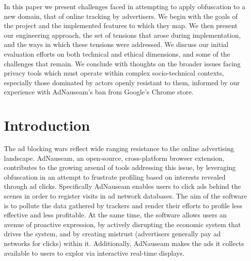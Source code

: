 \documentclass[conference]{IEEEtran}
\begin{document}
\indent In this paper we present challenges faced in attempting to apply obfuscation to a new domain, that of online tracking by advertisers. We begin with the goals of the project and the implemented features to which they map. We then present our engineering approach, the set of tensions that arose during implementation, and the ways in which these tensions were addressed. We discuss our initial evaluation efforts on both technical and ethical dimensions, and some of the challenges that remain. We conclude with thoughts on the broader issues facing privacy tools which must operate within complex socio-technical contexts, especially those dominated by actors openly resistant to them, informed by our experience with AdNauseam’s ban from Google's Chrome store.

%


\section{Introduction}

The ad blocking wars \cite{Murphy} reflect wide ranging resistance to the online advertising landscape. AdNauseam, an open-source, cross-platform browser extension, contributes to the growing arsenal of tools addressing this issue, by leveraging obfuscation in an attempt to frustrate profiling based on interests revealed through ad clicks. Specifically AdNauseam enables users to click ads behind the scenes in order to register visits in ad network databases. The aim of the software is to pollute the data gathered by trackers and  render their efforts to profile less effective and less profitable. At the same time, the software allows users an avenue of proactive expression, by actively disrupting the economic system that drives the system, and by creating mistrust (advertisers generally pay ad networks for clicks) within it. Additionally, AdNauseam makes the ads it collects available to users to explor via interactive real-time displays.
\end{document}
